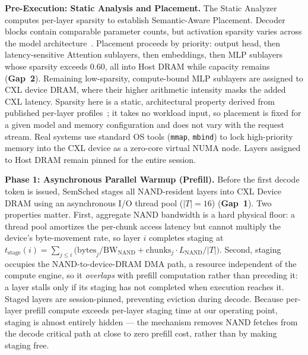 \documentclass[10pt,conference,letterpaper]{IEEEtran}
\begin{document}
\noindent
\textbf{Pre-Execution: Static Analysis and Placement.} The Static Analyzer computes per-layer sparsity to establish Semantic-Aware Placement. Decoder blocks contain comparable parameter counts, but activation sparsity varies across the model architecture~\cite{wild2024uncovering}. Placement proceeds by priority: output head, then latency-sensitive Attention sublayers, then embeddings, then MLP sublayers whose sparsity exceeds $0.60$, all into Host DRAM while capacity remains (\textbf{Gap~2}). Remaining low-sparsity, compute-bound MLP sublayers are assigned to CXL device DRAM, where their higher arithmetic intensity masks the added CXL latency. Sparsity here is a static, architectural property derived from published per-layer profiles~\cite{wild2024uncovering}; it takes no workload input, so placement is fixed for a given model and memory configuration and does not vary with the request stream. Real systems use standard OS tools (\texttt{mmap}, \texttt{mbind}) to lock high-priority memory into the CXL device as a zero-core virtual NUMA node. Layers assigned to Host DRAM remain pinned for the entire session.

\noindent
\textbf{Phase 1: Asynchronous Parallel Warmup (Prefill).} Before the first decode token is issued, SemSched stages all NAND-resident layers into CXL Device DRAM using an asynchronous I/O thread pool ($|T|{=}16$) (\textbf{Gap~1}). Two properties matter. First, aggregate NAND bandwidth is a hard physical floor: a thread pool amortizes the per-chunk access latency but cannot multiply the device's byte-movement rate, so layer $i$ completes staging at $t_{\text{stage}}(i) = \sum_{j \le i} \big(\text{bytes}_j/\text{BW}_\text{NAND} + \text{chunks}_j \cdot L_\text{NAND}/|T|\big)$. Second, staging occupies the NAND-to-device-DRAM DMA path, a resource independent of the compute engine, so it \emph{overlaps} with prefill computation rather than preceding it: a layer stalls only if its staging has not completed when execution reaches it. Staged layers are session-pinned, preventing eviction during decode. Because per-layer prefill compute exceeds per-layer staging time at our operating point, staging is almost entirely hidden --- the mechanism removes NAND fetches from the decode critical path at close to zero prefill cost, rather than by making staging free.
\end{document}
